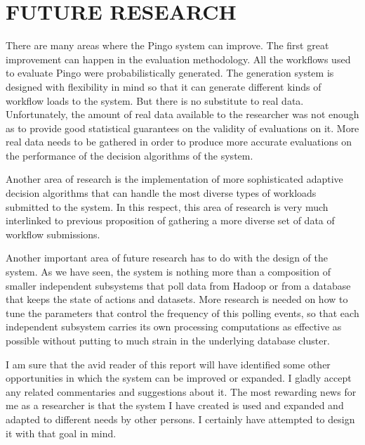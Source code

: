 \chapter{FUTURE RESEARCH}
\label{chap:future}
There are many areas where the Pingo system can improve.  The first great improvement can happen in the evaluation methodology. All the workflows used to evaluate Pingo were probabilistically generated.   The generation system is designed with flexibility in mind so that it can generate different kinds of workflow loads to the system.  But there is no substitute to real data. Unfortunately, the amount of real data available to the researcher was not enough as to provide good statistical guarantees on the validity of evaluations on it. More real data needs to be gathered in order to produce more accurate evaluations on the performance of the decision algorithms of the system.

Another area of research is the implementation of more sophisticated adaptive decision algorithms that can handle the most diverse types of workloads submitted to the system.  In this respect, this area of research is very much interlinked to previous proposition of gathering a more diverse set of data of workflow submissions. 

Another important area of future research has to do with the design of the system. As we have seen, the system is nothing more than a composition of smaller independent subsystems that poll data from Hadoop or from a database that keeps the state of actions and datasets.  More research is needed on how to tune the parameters that control the frequency of this polling events, so that each independent subsystem carries its own processing computations as effective as possible without putting to much strain in the underlying database cluster.

I am sure that the avid reader of this report will have identified some other opportunities in which the system can be improved or expanded. I gladly accept any related commentaries and suggestions about it. The most rewarding news for me as a researcher is that the system I have created is used and expanded and adapted to different needs by other persons. I certainly have attempted to design it with that goal in mind.